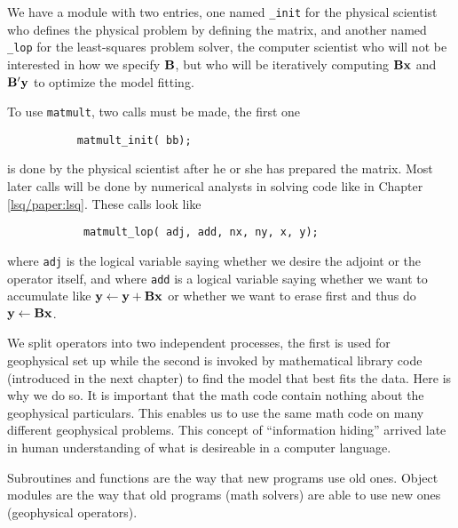 We have a module with two entries,
one named {\tt \_init} 
for the physical scientist who defines the physical problem by
defining the matrix, and
another named {\tt \_lop} 
for the least-squares problem solver,
the computer scientist who will not be interested
in how we specify $\bold B$, but who will be iteratively computing
$\bold B\bold x$ and $\bold B' \bold y$
to optimize the model fitting.
\begin{comment}
The lines beginning with {\tt {\#}{\%}} are expanded by Loptran into
more verbose and distracting Fortran 90 code.
The second line in the module \texttt{matmult},
however,
is pure Fortran syntax saying that
{\tt bb} is a pointer to a real-valued matrix.
\end{comment}
\par
To use \texttt{matmult}, two calls must be made,
the first one
\begin{verbatim}
           matmult_init( bb);
\end{verbatim}
is done by the physical scientist after he or she has prepared the matrix.
Most later calls will be done by numerical analysts
in solving code like in Chapter \ref{lsq/paper:lsq}.
These calls look like
\begin{verbatim}
            matmult_lop( adj, add, nx, ny, x, y);
\end{verbatim}
where {\tt adj} is the logical variable saying whether we desire
the adjoint or the operator itself,
and where {\tt add} is a logical variable saying
whether we want to accumulate like
$\bold y \leftarrow \bold y+\bold B\bold x$
or whether we want to erase first and thus do
$\bold y \leftarrow \bold B\bold x$.
\begin{comment}
The return value {\tt stat} is an integer parameter,
mostly useless (unless you want to use it for error codes). 
\par
Operator initialization often allocates memory.
To release this memory, you can {\tt call matmult\_close()}
although in this case nothing really happens.
\end{comment}
\par
We split operators into two independent processes,
the first is used for geophysical set up
while the second is invoked by mathematical library code
(introduced in the next chapter)
to find the model that best fits the data.
Here is why we do so.
It is important that the math code contain nothing about
the geophysical particulars.  This enables us to use
the same math code on many different geophysical problems.
This concept of ``information hiding'' arrived late in
human understanding of what is desireable in a computer language.
\begin{comment}
This feature alone is valuable enough to warrant
upgrading from Fortran 77 to Fortran 90, and likewise from C to C++.
\end{comment}
Subroutines and functions are the way that new programs use old ones.
Object modules are the way that old programs (math solvers)
are able to use new ones (geophysical operators).


